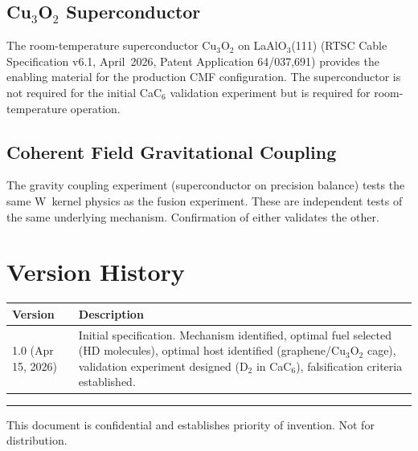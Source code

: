 \documentclass[11pt, a4paper]{article}
\begin{document}
\subsection{Cu$_3$O$_2$ Superconductor}

The room-temperature superconductor Cu$_3$O$_2$ on LaAlO$_3$(111)
(RTSC Cable Specification v6.1, April~2026, Patent Application
64/037,691) provides the enabling material for the production
CMF configuration. The superconductor is not required for the
initial CaC$_6$ validation experiment but is required for
room-temperature operation.

\subsection{Coherent Field Gravitational Coupling}

The gravity coupling experiment (superconductor on precision
balance) tests the same W~kernel physics as the fusion
experiment. These are independent tests of the same underlying
mechanism. Confirmation of either validates the other.

\section{Version History}

\begin{center}
\begin{tabular}{@{}lp{10.5cm}@{}}
\toprule
\textbf{Version} & \textbf{Description} \\
\midrule
1.0 (Apr 15, 2026) & Initial specification. Mechanism identified,
                      optimal fuel selected (HD molecules), optimal
                      host identified (graphene/Cu$_3$O$_2$ cage),
                      validation experiment designed (D$_2$ in
                      CaC$_6$), falsification criteria established. \\
\bottomrule
\end{tabular}
\end{center}

\vspace{2em}
\hrule
\vspace{0.5em}
{\color{nm-gray}\small This document is confidential and
establishes priority of invention. Not for distribution.}
\end{document}
